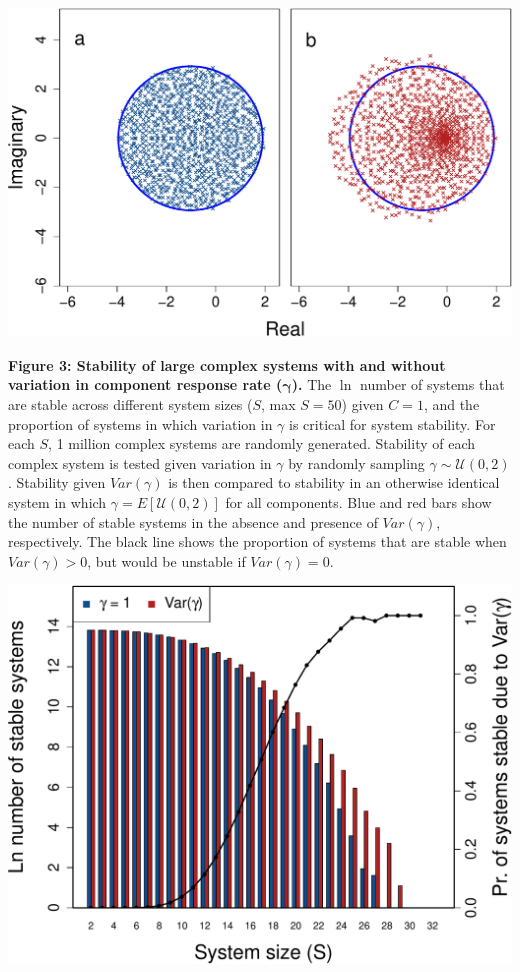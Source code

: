 \documentclass[]{article}
\begin{document}
\includegraphics{ms_files/figure-latex/unnamed-chunk-13-1.pdf}

\clearpage

\textbf{Figure 3: Stability of large complex systems with and without
variation in component response rate (\(\boldsymbol{\gamma}\)).} The
\(\ln\) number of systems that are stable across different system sizes
(\(S\), max \(S=50\)) given \(C = 1\), and the proportion of systems in
which variation in \(\gamma\) is critical for system stability. For each
\(S\), 1 million complex systems are randomly generated. Stability of
each complex system is tested given variation in \(\gamma\) by randomly
sampling \(\gamma \sim \mathcal{U}(0, 2)\). Stability given
\(Var(\gamma)\) is then compared to stability in an otherwise identical
system in which \(\gamma = E[\mathcal{U}(0, 2)]\) for all components.
Blue and red bars show the number of stable systems in the absence and
presence of \(Var(\gamma)\), respectively. The black line shows the
proportion of systems that are stable when \(Var(\gamma) > 0\), but
would be unstable if \(Var(\gamma) = 0\).

\includegraphics{ms_files/figure-latex/unnamed-chunk-15-1.pdf}
\end{document}

